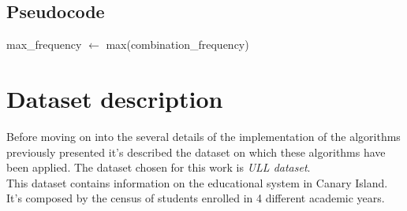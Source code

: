 \documentclass[12pt,a4paper,openright,twoside]{book}
\begin{document}
\subsection{Pseudocode}
\begin{algorithm}[H]


    max\_frequency $\gets$ max(combination\_frequency)\;
\end{algorithm}

\section{Dataset description}
Before moving on into the several details of the implementation of the algorithms previously presented it's described the dataset on which these algorithms have been applied.
The dataset chosen for this work is \emph{ULL dataset}. \\
This dataset contains information on the educational system in Canary Island. It's composed by the census of students enrolled in 4 different academic years.
\end{document}
